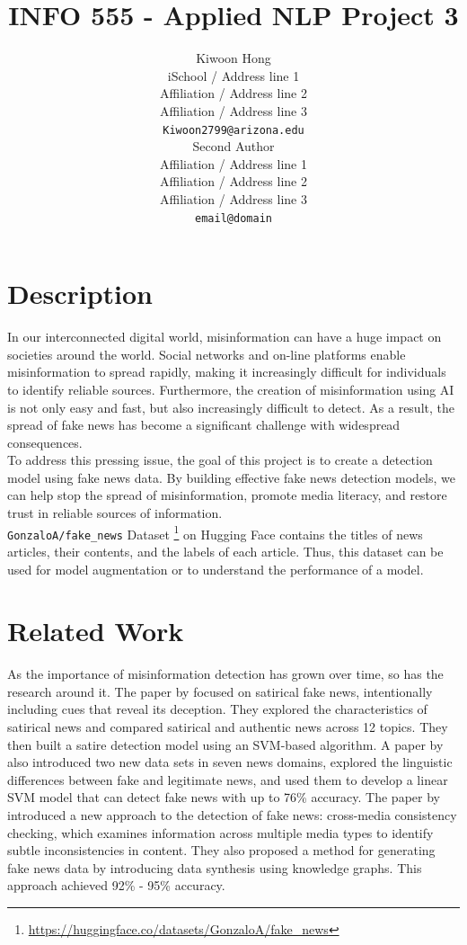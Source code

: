 \documentclass[11pt]{article}
\title{INFO 555 - Applied NLP Project 3}
\author{Kiwoon Hong \\
  iSchool / Address line 1 \\
  Affiliation / Address line 2 \\
  Affiliation / Address line 3 \\
  \texttt{Kiwoon2799@arizona.edu} \\\And
  Second Author \\
  Affiliation / Address line 1 \\
  Affiliation / Address line 2 \\
  Affiliation / Address line 3 \\
  \texttt{email@domain} \\}
\begin{document}
\maketitle


\section{Description}

In our interconnected digital world, misinformation can have a huge impact on societies around the world. Social networks and on-line platforms enable misinformation to spread rapidly, making it increasingly difficult for individuals to identify reliable sources. Furthermore, the creation of misinformation using AI is not only easy and fast, but also increasingly difficult to detect. As a result, the spread of fake news has become a significant challenge with widespread consequences. \\
To address this pressing issue, the goal of this project is to create a detection model using fake news data. By building effective fake news detection models, we can help stop the spread of misinformation, promote media literacy, and restore trust in reliable sources of information.\\
\texttt{GonzaloA/fake\_news} Dataset \footnote{\url{https://huggingface.co/datasets/GonzaloA/fake_news}} on Hugging Face contains the titles of news articles, their contents, and the labels of each article. Thus, this dataset can be used for model augmentation or to understand the performance of a model.


\section{Related Work}

As the importance of misinformation detection has grown over time, so has the research around it. The paper by \citet{rubin-etal-2016-fake} focused on satirical fake news, intentionally including cues that reveal its deception. They explored the characteristics of satirical news and compared satirical and authentic news across 12 topics. They then built a satire detection model using an SVM-based algorithm. A paper by \citet{perez-rosas-etal-2018-automatic} also introduced two new data sets in seven news domains, explored the linguistic differences between fake and legitimate news, and used them to develop a linear SVM model that can detect fake news with up to 76\% accuracy. The paper by \citet{fung-etal-2021-infosurgeon} introduced a new approach to the detection of fake news: cross-media consistency checking, which examines information across multiple media types to identify subtle inconsistencies in content. They also proposed a method for generating fake news data by introducing data synthesis using knowledge graphs. This approach achieved 92\% - 95\% accuracy.
\end{document}
